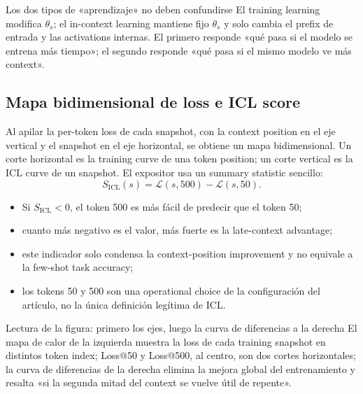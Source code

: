 
\begin{importantbox}{Los dos tipos de «aprendizaje» no deben confundirse}
El training learning modifica $\theta_s$; el in-context learning mantiene fijo $\theta_s$ y solo cambia el prefix de entrada y las activations internas. El primero responde «qué pasa si el modelo se entrena más tiempo»; el segundo responde «qué pasa si el mismo modelo ve más context».
\end{importantbox}

\subsection{Mapa bidimensional de loss e ICL score}

Al apilar la per-token loss de cada snapshot, con la context position en el eje vertical y el snapshot en el eje horizontal, se obtiene un mapa bidimensional. Un corte horizontal es la training curve de una token position; un corte vertical es la ICL curve de un snapshot. El expositor usa un summary statistic sencillo:
\[
S_{\mathrm{ICL}}(s)
=\mathcal{L}(s,500)-\mathcal{L}(s,50).
\]

\begin{itemize}
  \item Si $S_{\mathrm{ICL}}<0$, el token 500 es más fácil de predecir que el token 50;
  \item cuanto más negativo es el valor, más fuerte es la late-context advantage;
  \item este indicador solo condensa la context-position improvement y no equivale a la few-shot task accuracy;
  \item los tokens 50 y 500 son una operational choice de la configuración del artículo, no la única definición legítima de ICL.
\end{itemize}


\begin{knowledgebox}{Lectura de la figura: primero los ejes, luego la curva de diferencias a la derecha}
El mapa de calor de la izquierda muestra la loss de cada training snapshot en distintos token index; Loss@50 y Loss@500, al centro, son dos cortes horizontales; la curva de diferencias de la derecha elimina la mejora global del entrenamiento y resalta «si la segunda mitad del context se vuelve útil de repente».
\end{knowledgebox}

